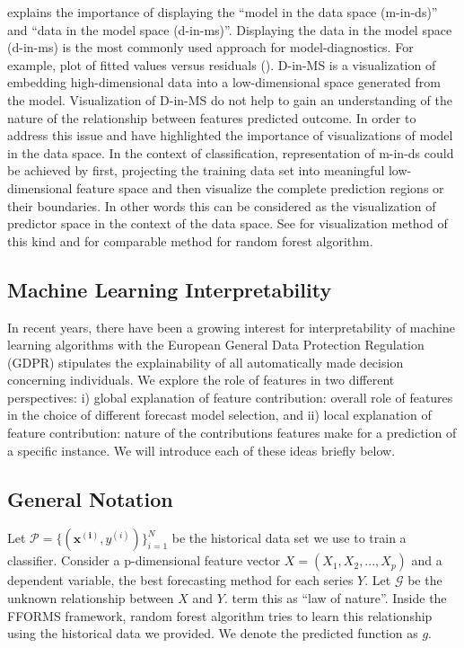 \documentclass[11pt,a4paper,]{article}
\begin{document}
\textcite{wickham2015visualizing} explains the importance of displaying
the ``model in the data space (m-in-ds)'' and ``data in the model space
(d-in-ms)''. Displaying the data in the model space (d-in-ms) is the
most commonly used approach for model-diagnostics. For example, plot of
fitted values versus residuals (\textcite{wickham2015visualizing}).
D-in-MS is a visualization of embedding high-dimensional data into a
low-dimensional space generated from the model. Visualization of D-in-MS
do not help to gain an understanding of the nature of the relationship
between features predicted outcome. In order to address this issue
\textcite{wickham2015visualizing} and \textcite{da2017interactive} have
highlighted the importance of visualizations of model in the data space.
In the context of classification, representation of m-in-ds could be
achieved by first, projecting the training data set into meaningful
low-dimensional feature space and then visualize the complete prediction
regions or their boundaries. In other words this can be considered as
the visualization of predictor space in the context of the data space.
See \textcite{wickham2015visualizing} for visualization method of this
kind and \textcite{da2017interactive} for comparable method for random
forest algorithm.

\subsection{Machine Learning
Interpretability}\label{machine-learning-interpretability}

In recent years, there have been a growing interest for interpretability
of machine learning algorithms with the European General Data Protection
Regulation (GDPR) stipulates the explainability of all automatically
made decision concerning individuals. We explore the role of features in
two different perspectives: i) global explanation of feature
contribution: overall role of features in the choice of different
forecast model selection, and ii) local explanation of feature
contribution: nature of the contributions features make for a prediction
of a specific instance. We will introduce each of these ideas briefly
below.

\subsection{General Notation}\label{general-notation}

Let \(\mathcal{P}=\{(\mathbf{x^{(i)}}, y^{(i)})\}_{i=1}^{N}\) be the
historical data set we use to train a classifier. Consider a
p-dimensional feature vector \(X=(X_1, X_2, ..., X_p)\) and a dependent
variable, the best forecasting method for each series \(Y\). Let
\(\mathcal{G}\) be the unknown relationship between \(X\) and \(Y\).
\textcite{Zhao} term this as ``law of nature''. Inside the FFORMS
framework, random forest algorithm tries to learn this relationship
using the historical data we provided. We denote the predicted function
as \(g\).
\end{document}
